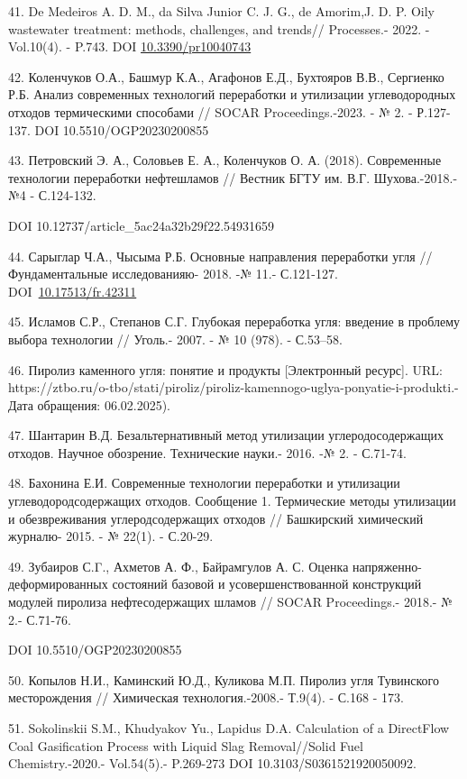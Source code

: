 \begin{references}
41. De Medeiros A. D. M., da Silva Junior C. J. G., de Amorim,J. D. P.
Oily wastewater treatment: methods, challenges, and trends// Processes.-
2022. - Vol.10(4). - P.743. DOI
\href{http://dx.doi.org/10.3390/pr10040743}{10.3390/pr10040743}

42. Коленчуков О.А., Башмур К.А., Агафонов Е.Д., Бухтояров В.В.,
Сергиенко Р.Б. Анализ современных технологий переработки и утилизации
углеводородных отходов термическими способами // SOCAR
Proceedings.-2023. - № 2. - Р.127-137. DOI 10.5510/OGP20230200855

43. Петровский Э. А., Соловьев Е. А., Коленчуков О. А. (2018).
Современные технологии переработки нефтешла­мов // Вестник БГТУ им. В.Г.
Шухова.-2018.- №4 - С.124-132.

DOI 10.12737/article\_5ac24a32b29f22.54931659

44. Сарыглар Ч.А., Чысыма Р.Б. Основные направления переработки угля //
Фундаментальные исследованияю- 2018. -№ 11.- С.121-127.
DOI~\href{https://doi.org/10.17513/fr.42311}{10.17513/fr.42311}

45. Исламов С.Р., Степанов С.Г. Глубокая переработка угля: введение в
проблему выбора технологии // Уголь.- 2007. - № 10 (978). - С.53--58.

46. Пиролиз каменного угля: понятие и продукты {[}Электронный ресурс{]}.
URL:
https://ztbo.ru/o-tbo/stati/piroliz/piroliz-kamennogo-uglya-ponyatie-i-produkti.-Дата
обращения: 06.02.2025).

47. Шантарин В.Д. Безальтернативный метод утилизации углеродосодержащих
отходов. Научное обо­зрение. Технические науки.- 2016. -№ 2. - С.71-74.

48. Бахонина Е.И. Современные технологии переработки и утилизации
углеводородсодержащих отходов. Сообщение 1. Термические методы
утилизации и обезвреживания углеродсодержащих отходов // Башкирский
хими­ческий журналю- 2015. - № 22(1). - С.20-29.

49. Зубаиров С.Γ., Ахметов А. Ф., Байрамгулов А. С. Оценка
напряженно-деформированных состояний базовой и усовершенствованной
конструкций модулей пиролиза нефтесодержащих шламов // SOCAR
Proceedings.- 2018.- № 2.- С.71-76.

DOI 10.5510/OGP20230200855

50. Копылов Н.И., Каминский Ю.Д., Куликова М.П. Пиролиз угля Тувинского
месторождения // Химическая технология.-2008.- Т.9(4). - С.168 - 173.

51. Sokolinskii S.M., Khudyakov Yu., Lapidus D.A. Calculation of a
DirectFlow Coal Gasification Process with Liquid Slag Removal//Solid
Fuel Chemistry.-2020.- Vol.54(5).- P.269-273 DOI
10.3103/S0361521920050092.


\end{references}
